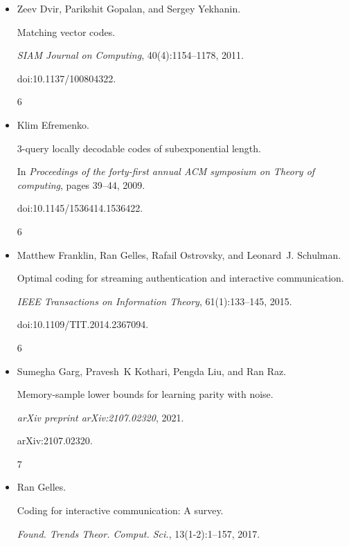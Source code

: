 \documentclass[10pt,a4paper]{article}
\begin{document}
\begin{itemize}
doi:10.1145/2746539.2746591.


6




\item[] 
[6]

Zeev Dvir, Parikshit Gopalan, and Sergey Yekhanin.


Matching vector codes.


\emph{SIAM Journal on Computing}, 40(4):1154–1178, 2011.


doi:10.1137/100804322.


6




\item[] 
[7]

Klim Efremenko.


3-query locally decodable codes of subexponential length.


In \emph{Proceedings of the forty-first annual ACM symposium on Theory
of computing}, pages 39–44, 2009.


doi:10.1145/1536414.1536422.


6




\item[] 
[8]

Matthew Franklin, Ran Gelles, Rafail Ostrovsky, and Leonard J. Schulman.


Optimal coding for streaming authentication and interactive
communication.


\emph{IEEE Transactions on Information Theory}, 61(1):133–145, 2015.


doi:10.1109/TIT.2014.2367094.


6




\item[] 
[9]

Sumegha Garg, Pravesh K Kothari, Pengda Liu, and Ran Raz.


Memory-sample lower bounds for learning parity with noise.


\emph{arXiv preprint arXiv:2107.02320}, 2021.


arXiv:2107.02320.


7




\item[] 
[10]

Ran Gelles.


Coding for interactive communication: A survey.


\emph{Found. Trends Theor. Comput. Sci.}, 13(1-2):1–157, 2017.



\end{itemize}
\end{document}
